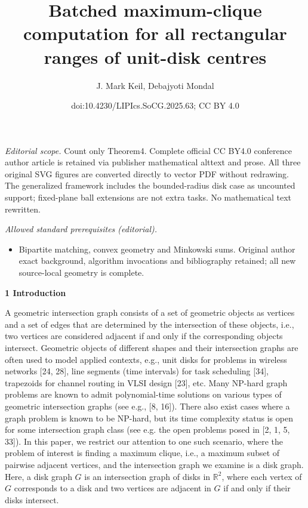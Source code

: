 \documentclass[10pt,a4paper]{amsart}
\title{Batched maximum-clique computation for all rectangular ranges of unit-disk centres}
\author{J. Mark Keil, Debajyoti Mondal}
\date{doi:10.4230/LIPIcs.SoCG.2025.63; CC BY 4.0}
\begin{document}
\maketitle
\noindent\textit{Editorial scope.} Count only Theorem4. Complete official CC BY4.0 conference author article is retained via publisher mathematical alttext and prose. All three original SVG figures are converted directly to vector PDF without redrawing. The generalized framework includes the bounded-radius disk case as uncounted support; fixed-plane ball extensions are not extra tasks. No mathematical text rewritten.\par\medskip
\noindent\textit{Allowed standard prerequisites (editorial).}\begin{itemize}
\item Bipartite matching, convex geometry and Minkowski sums. Original author exact background, algorithm invocations and bibliography retained; all new source-local geometry is complete.
\end{itemize}\medskip
\par\medskip\noindent\textbf{1 Introduction}\par
A geometric intersection graph consists of a set of geometric objects as vertices and a set of edges that are determined by the intersection of these objects, i.e., two vertices are considered adjacent if and only if the corresponding objects intersect. Geometric objects of different shapes and their intersection graphs are often used to model applied contexts, e.g., unit disks for problems in wireless networks [24, 28], line segments (time intervals) for task scheduling [34], trapezoids for channel routing in VLSI design [23], etc. Many NP-hard graph problems are known to admit polynomial-time solutions on various types of geometric intersection graphs (see e.g., [8, 16]). There also exist cases where a graph problem is known to be NP-hard, but its time complexity status is open for some intersection graph class (see e.g. the open problems posed in [2, 1, 5, 33]). In this paper, we restrict our attention to one such scenario, where the problem of interest is finding a maximum clique, i.e., a maximum subset of pairwise adjacent vertices, and the intersection graph we examine is a disk graph. Here, a disk graph $G$ is an intersection graph of disks in $\mathbb{R}^{2}$, where each vertex of $G$ corresponds to a disk and two vertices are adjacent in $G$ if and only if their disks intersect.
\par
\par
\end{document}
